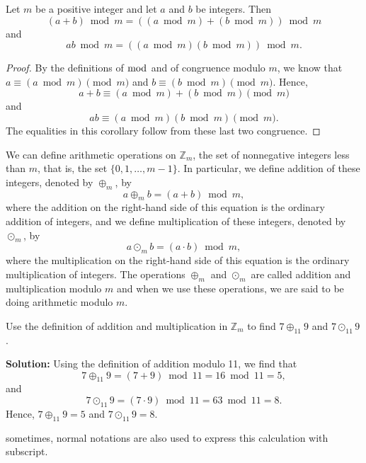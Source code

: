         \begin{corollary}
            Let $m$ be a positive integer and let $a$ and $b$ be integers. Then
            \begin{equation*}
                (a + b) \bmod m = ((a \bmod m) + (b \bmod m)) \bmod m
            \end{equation*}
            and
            \begin{equation*}
                ab \bmod m = ((a \bmod m)(b \bmod m)) \bmod m.
            \end{equation*}
            \end{corollary}
            
            \begin{proof}
            By the definitions of $\bmod$ and of congruence modulo $m$, we know that $a \equiv (a \bmod m) \pmod{m}$ and $b \equiv (b \bmod m) \pmod{m}$. Hence,
            \begin{equation*}
                a + b \equiv (a \bmod m) + (b \bmod m) \pmod{m}
            \end{equation*}
            and
            \begin{equation*}
                ab \equiv (a \bmod m)(b \bmod m) \pmod{m}.
            \end{equation*}
            The equalities in this corollary follow from these last two congruence.
            \end{proof}

            We can define arithmetic operations on \( \mathbb{Z}_m \), the set of nonnegative integers less than \( m \), that is, the set \( \{0, 1, \ldots, m - 1\} \). In particular, we define addition of these integers, denoted by \( \oplus_m \), by
        \[
        a \oplus_m b = (a + b) \bmod m,
        \]
        where the addition on the right-hand side of this equation is the ordinary addition of integers, and we define multiplication of these integers, denoted by \( \odot_m \), by
        \[
        a \odot_m b = (a \cdot b) \bmod m,
        \]
        where the multiplication on the right-hand side of this equation is the ordinary multiplication of integers. The operations \( \oplus_m \) and \( \odot_m \) are called addition and multiplication modulo \( m \) and when we use these operations, we are said to be doing arithmetic modulo \( m \).

        \begin{example}
        Use the definition of addition and multiplication in \( \mathbb{Z}_m \) to find \( 7 \oplus_{11} 9 \) and \( 7 \odot_{11} 9 \).

        \textbf{Solution:} Using the definition of addition modulo 11, we find that
        \[
        7 \oplus_{11} 9 = (7 + 9) \bmod 11 = 16 \bmod 11 = 5,
        \]
        and
        \[
        7 \odot_{11} 9 = (7 \cdot 9) \bmod 11 = 63 \bmod 11 = 8.
        \]
        Hence, \( 7 \oplus_{11} 9 = 5 \) and \( 7 \odot_{11} 9 = 8 \).
        \end{example}
        \begin{remark}
            sometimes, normal notations are also used to express this calculation with subscript.
        \end{remark}


